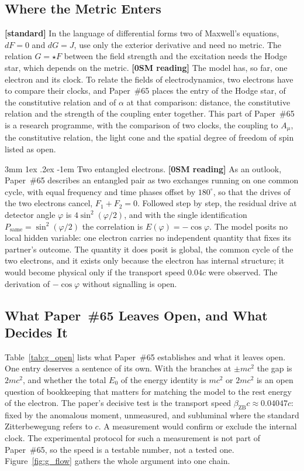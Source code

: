 \documentclass[%
 reprint, amsmath,amssymb, aps, prb, ]{revtex4-2}
\makeatletter
\numberwithin{equation}{section}
\renewcommand\paragraph{%
  \@startsection{paragraph}{4}{\z@}%
    {3mm \@plus 1ex \@minus .2ex}%
    {-1em}%
    {\normalfont\normalsize\itshape}}
\newcommand{\hodge}{\star}
\newcommand{\betaZB}{\beta_{\text{ZB}}}
\makeatother
\begin{document}
\subsection{Where the Metric Enters}
\label{subsec:g_metric}

\textbf{[standard]} In the language of differential forms two of Maxwell's equations, $dF = 0$ and $dG = J$, use only the exterior derivative and need no metric. The relation $G = \hodge F$ between the field strength and the excitation needs the Hodge star, which depends on the metric. \textbf{[0SM reading]} The model has, so far, one electron and its clock. To relate the fields of electrodynamics, two electrons have to compare their clocks, and Paper~\#65 places the entry of the Hodge star, of the constitutive relation and of $\alpha$ at that comparison: distance, the constitutive relation and the strength of the coupling enter together. This part of Paper~\#65 is a research programme, with the comparison of two clocks, the coupling to $A_\mu$, the constitutive relation, the light cone and the spatial degree of freedom of spin listed as open.

\paragraph{Two entangled electrons.} \textbf{[0SM reading]} As an outlook, Paper~\#65 describes an entangled pair as two exchanges running on one common cycle, with equal frequency and time phases offset by $180^\circ$, so that the drives of the two electrons cancel, $F_1 + F_2 = 0$. Followed step by step, the residual drive at detector angle $\varphi$ is $4\sin^{2}(\varphi/2)$, and with the single identification $P_{\text{same}} = \sin^{2}(\varphi/2)$ the correlation is $E(\varphi) = -\cos\varphi$. The model posits no local hidden variable: one electron carries no independent quantity that fixes its partner's outcome. The quantity it does posit is global, the common cycle of the two electrons, and it exists only because the electron has internal structure; it would become physical only if the transport speed $0.04c$ were observed. The derivation of $-\cos\varphi$ without signalling is open.

\subsection{What Paper~\#65 Leaves Open, and What Decides It}
\label{subsec:g_open}

Table~\ref{tab:g_open} lists what Paper~\#65 establishes and what it leaves open. One entry deserves a sentence of its own. With the branches at $\pm mc^{2}$ the gap is $2mc^{2}$, and whether the total $E_0$ of the energy identity is $mc^{2}$ or $2mc^{2}$ is an open question of bookkeeping that matters for matching the model to the rest energy of the electron. The paper's decisive test is the transport speed $\betaZB c \approx 0.04047c$: fixed by the anomalous moment, unmeasured, and subluminal where the standard Zitterbewegung refers to $c$. A measurement would confirm or exclude the internal clock. The experimental protocol for such a measurement is not part of Paper~\#65, so the speed is a testable number, not a tested one. Figure~\ref{fig:g_flow} gathers the whole argument into one chain.
\end{document}

